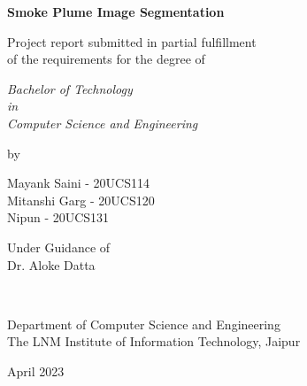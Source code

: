 \thispagestyle{empty}
\begin{center}
{\Large \bf Smoke Plume Image Segmentation}


\vspace*{1.75cm}
{\large Project report submitted in partial fulfillment\\}
{\large  of the requirements for the degree of \\}

\vspace*{1cm}
{\it {\large Bachelor of Technology} \\
{\large in\\}
{\large Computer Science and Engineering \\}}

\vspace*{1cm}
{\large by}

\vspace*{1cm}
{\large Mayank Saini - 20UCS114\\}
{\large Mitanshi Garg - 20UCS120\\}
{\large Nipun - 20UCS131\\}


\vspace*{5mm}
{\large Under Guidance of \\}
{\large Dr. Aloke Datta \\}

\vspace*{1.0cm}
{\\}

\vspace*{2.0cm}
{\large Department of Computer Science and Engineering\\}
{\large The LNM Institute of Information Technology, Jaipur\\}

\vspace*{1.0cm}
{\large April 2023 \\}
\end{center}

\clearpage
